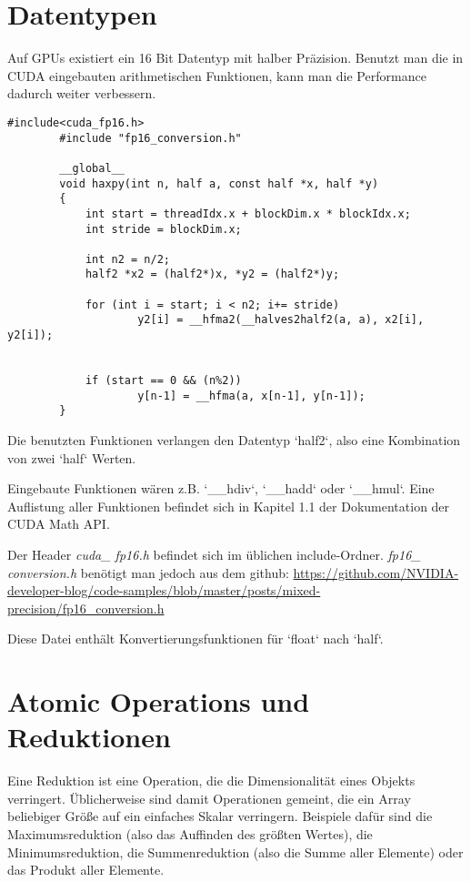 		\section{Datentypen}
		Auf GPUs existiert ein 16 Bit Datentyp mit halber Präzision. Benutzt man die in CUDA eingebauten arithmetischen Funktionen, kann man die Performance dadurch weiter verbessern.			
		\begin{lstlisting}[caption=Half Precision]
		#include<cuda_fp16.h>
		#include "fp16_conversion.h"
		
		__global__
		void haxpy(int n, half a, const half *x, half *y)
		{
    		int start = threadIdx.x + blockDim.x * blockIdx.x;
    		int stride = blockDim.x;

			int n2 = n/2;
			half2 *x2 = (half2*)x, *y2 = (half2*)y;

			for (int i = start; i < n2; i+= stride) 
					y2[i] = __hfma2(__halves2half2(a, a), x2[i], y2[i]);


			if (start == 0 && (n%2))
					y[n-1] = __hfma(a, x[n-1], y[n-1]);
		}
		\end{lstlisting}
		
	    Die benutzten Funktionen verlangen den Datentyp \li`half2`, also eine Kombination von zwei \li`half` Werten.
	    
		Eingebaute Funktionen wären z.B. \li`__hdiv`, \li`__hadd` oder \li`__hmul`. Eine Auflistung aller Funktionen befindet sich in Kapitel 1.1 der Dokumentation der CUDA Math \Gls{API}. \autocite{cudaMath}
		
		Der Header \textit{cuda\_ fp16.h} befindet sich im üblichen include-Ordner. \textit{fp16\_ conversion.h} benötigt man jedoch aus dem github: \url{https://github.com/NVIDIA-developer-blog/code-samples/blob/master/posts/mixed-precision/fp16_conversion.h}
		
		Diese Datei enthält Konvertierungsfunktionen für \li`float` nach \li`half`.
	
		
		\section{Atomic Operations und Reduktionen}\label{red}
		Eine Reduktion ist eine Operation, die die Dimensionalität eines Objekts verringert. Üblicherweise sind damit Operationen gemeint, die ein Array beliebiger Größe auf ein einfaches Skalar verringern. Beispiele dafür sind die Maximumsreduktion (also das Auffinden des größten Wertes), die Minimumsreduktion, die Summenreduktion (also die Summe aller Elemente) oder das Produkt aller Elemente. 
		
